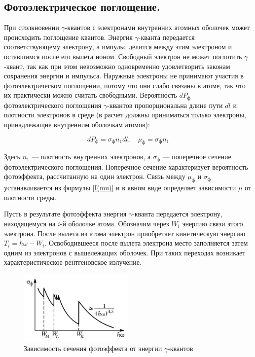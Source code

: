 \documentclass[a4paper,12pt]{report}
\begin{document}
	\subsection*{Фотоэлектрическое поглощение.} При столкновении $\gamma$-квантов с электронами внутренних атомных оболочек может происходить поглощение квантов. Энергия $\gamma$-кванта передается соответствующему электрону, а импульс делится между этим электроном и оставшимся после его вылета ионом. Свободный электрон не может поглотить $\gamma$-квант, так как при этом невозможно одновременно удовлетворить законам сохранения энергии и импульса. Наружные электроны не принимают участия в фотоэлектрическом поглощении, потому что они слабо связаны в атоме, так что их практически можно считать свободными. Вероятность $ dP_{\text{ф}} $ фотоэлектрического поглощения $\gamma$-квантов пропорциональна длине пути $ dl $ и плотности электронов в среде (в расчет должны приниматься только электроны, принадлежащие внутренним оболочкам атомов):
	
	\begin{equation}\label{mu ph}
	dP_{\text{ф}} = \sigma_{\text{ф}} n_1 dl, \quad \mu_{\text{ф}} = \sigma_{\text{ф}} n_1
	\end{equation}
	
	Здесь $ n_1 $ --- плотность внутренних электронов, а $ \sigma_{\text{ф}} $ --- поперечное сечение фотоэлектрического поглощения. Поперечное сечение характеризует вероятность фотоэффекта, рассчитанную на один электрон. Связь между $ \mu_{\text{ф}} $ и $ \sigma_{\text{ф}} $ устанавливается из формулы \eqref{I(mu)} и в явном виде определяет зависимости $ \mu $ от плотности среды.
	
	Пусть в результате фотоэффекта энергия $\gamma$-кванта передается
	электрону, находящемуся на $ i $-й оболочке атома. Обозначим через $ W_i $
	энергию связи этого электрона. После вылета из атома электрон приобретает кинетическую энергию $ T_i = \hbar \omega - W_i $.
	Освободившееся после вылета электрона место заполняется затем
	одним из электронов с вышележащих оболочек. При таких переходах
	возникает характеристическое рентгеновское излучение.
	
	\begin{figure}[H]
    \includegraphics[width = 0.5\textwidth]{2.jpg}
    \centering
    \caption{Зависимость сечения фотоэффекта от энергии $\gamma$-квантов }
    \end{figure}
	
\end{document}
